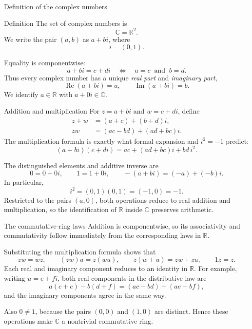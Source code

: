 \documentclass[aspectratio=169,11pt]{beamer}
\newcommand{\R}{\mathbb R}
\newcommand{\C}{\mathbb C}
\begin{document}
\begin{frame}{Definition of the complex numbers}
  \begin{block}{Definition}
    The set of complex numbers is
    \[
      \boxed{\C=\R^2.}
    \]
    We write the pair \((a,b)\) as \(a+bi\), where
    \[
      i=(0,1).
    \]
  \end{block}

  Equality is componentwise:
  \[
    a+bi=c+di
    \quad\Longleftrightarrow\quad
    a=c\ \text{ and }\ b=d.
  \]
  Thus every complex number has a unique \emph{real part} and
  \emph{imaginary part},
  \[
    \operatorname{Re}(a+bi)=a,
    \qquad
    \operatorname{Im}(a+bi)=b.
  \]
  We identify \(a\in\R\) with \(a+0i\in\C\).
\end{frame}

\begin{frame}{Addition and multiplication}
  For \(z=a+bi\) and \(w=c+di\), define
  \begin{align*}
    z+w&=(a+c)+(b+d)i,\\
    zw&=(ac-bd)+(ad+bc)i.
  \end{align*}
  The multiplication formula is exactly what formal expansion and
  \(i^2=-1\) predict:
  \[
    (a+bi)(c+di)
      =ac+(ad+bc)i+bd\,i^2.
  \]

  The distinguished elements and additive inverse are
  \[
    0=0+0i,
    \qquad
    1=1+0i,
    \qquad
    -(a+bi)=(-a)+(-b)i.
  \]
  In particular,
  \[
    i^2=(0,1)(0,1)=(-1,0)=-1.
  \]
  Restricted to the pairs \((a,0)\), both operations reduce to real
  addition and multiplication, so the identification of \(\R\) inside
  \(\C\) preserves arithmetic.
\end{frame}

\begin{frame}{The commutative-ring laws}
  Addition is componentwise, so its associativity and commutativity follow
  immediately from the corresponding laws in \(\R\).

  Substituting the multiplication formula shows that
  \[
    zw=wz,
    \qquad
    (zw)u=z(wu),
    \qquad
    z(w+u)=zw+zu,
    \qquad
    1z=z.
  \]
  Each real and imaginary component reduces to an identity in \(\R\).  For
  example, writing \(u=e+fi\), both real components in the distributive law
  are
  \[
    a(c+e)-b(d+f)=(ac-bd)+(ae-bf),
  \]
  and the imaginary components agree in the same way.

  Also \(0\ne1\), because the pairs \((0,0)\) and \((1,0)\) are distinct.
  Hence these operations make \(\C\) a nontrivial commutative ring.
\end{frame}
\end{document}
